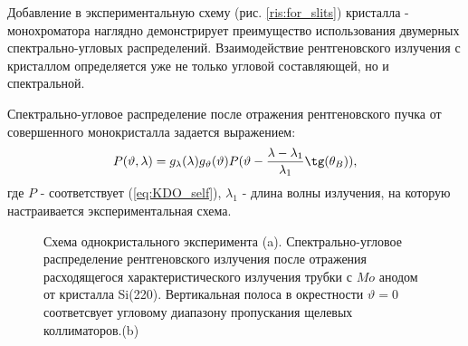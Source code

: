 \label{sec:single_crystal_section}

  Добавление в экспериментальную схему (рис. \ref{ris:for_slits}) кристалла - монохроматора
  наглядно демонстрирует преимущество использования двумерных спектрально-угловых распределений.
Взаимодействие рентгеновского излучения с кристаллом определяется уже не только
угловой составляющей, но и спектральной.

  Спектрально-угловое распределение после отражения рентгеновского пучка от
  совершенного монокристалла задается выражением:
  \begin{equation} \label{eq:monochromator_spectra}
    P(\vartheta,\lambda) = g_{\lambda}(\lambda)g_{\vartheta}(\vartheta) P(\vartheta - \frac{\lambda - \lambda_1}{\lambda_1}\tg(\theta_B)),
   \end{equation}
где $P$ - соответствует (\ref{eq:KDO_self}), $\lambda_1$ - длина волны излучения, на которую
настраивается экспериментальная схема.

\begin{figure}[H]
  \centering
  \hfill

  \caption{Схема однокристального эксперимента (a). Спектрально-угловое распределение
  рентгеновского излучения после отражения расходящегося характеристического излучения
  трубки с $Mo$ анодом от кристалла Si(220). Вертикальная полоса в окрестности
  $\vartheta = 0$ соответсвует угловому диапазону пропускания щелевых коллиматоров.(b)}
  \label{ris:single_crystal_schem_lamtet}
\end{figure}


